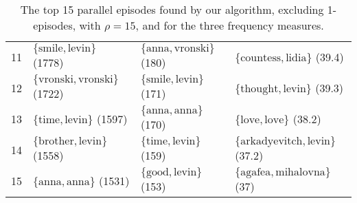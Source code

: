 \begin{table}
\begin{tabulary}{\textwidth}{R|L|L|L}
11 & $ \{ \text{smile},\allowbreak\text{levin} \} $ (1778) & $ \{ \text{anna},\allowbreak\text{vronski} \} $ (180) & $ \{ \text{countess},\allowbreak\text{lidia} \} $ (39.4) \\
12 & $ \{ \text{vronski},\allowbreak\text{vronski} \} $ (1722) & $ \{ \text{smile},\allowbreak\text{levin} \} $ (171) & $ \{ \text{thought},\allowbreak\text{levin} \} $ (39.3) \\
13 & $ \{ \text{time},\allowbreak\text{levin} \} $ (1597) & $ \{ \text{anna},\allowbreak\text{anna} \} $ (170) & $ \{ \text{love},\allowbreak\text{love} \} $ (38.2) \\
14 & $ \{ \text{brother},\allowbreak\text{levin} \} $ (1558) & $ \{ \text{time},\allowbreak\text{levin} \} $ (159) & $ \{ \text{arkadyevitch},\allowbreak\text{levin} \} $ (37.2) \\
15 & $ \{ \text{anna},\allowbreak\text{anna} \} $ (1531) & $ \{ \text{good},\allowbreak\text{levin} \} $ (153) & $ \{ \text{agafea},\allowbreak\text{mihalovna} \} $ (37) \\

\end{tabulary}

\caption{The top 15 parallel episodes found by our algorithm, excluding 1-episodes, with $ \rho = 15 $, and for the three frequency measures.}
\label{table:fmw-tolstoy-top-15-parallel->1-episodes}
\end{table}

